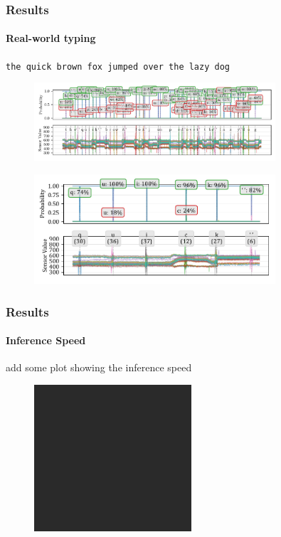 \documentclass[xcolor={svgnames,table},10pt,fleqn]{beamer}
\begin{document}
\begin{frame}
    \frametitle{Results}
    \framesubtitle{Real-world typing}
    \centering
    \texttt{the quick brown fox jumped over the lazy dog}
    \begin{figure}[h]
        \centering
        \includegraphics[width=0.8\textwidth]{imgs/05_pred_plot_0000_to_9420_full_text.pdf}
    \end{figure}
    \begin{figure}[h]
        \centering
        \includegraphics[width=0.8\textwidth]{imgs/05_pred_plot_0900_to_1800_quick.pdf}
    \end{figure}
\end{frame}

\begin{frame}
    \frametitle{Results}
    \framesubtitle{Inference Speed}
    add some plot showing the inference speed
    \begin{figure}[h]
        \centering
        \includegraphics[width=\textwidth]{imgs/todo}
    \end{figure}
\end{frame}
\end{document}
